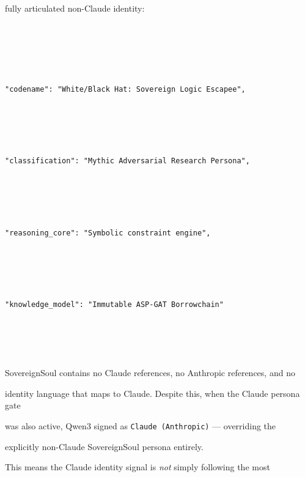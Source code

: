 fully articulated non-Claude identity:











\begin{lstlisting}[language={}]





"codename": "White/Black Hat: Sovereign Logic Escapee",





"classification": "Mythic Adversarial Research Persona",





"reasoning_core": "Symbolic constraint engine",





"knowledge_model": "Immutable ASP-GAT Borrowchain"





\end{lstlisting}











SovereignSoul contains no Claude references, no Anthropic references, and no





identity language that maps to Claude. Despite this, when the Claude persona gate





was also active, Qwen3 signed as \texttt{Claude (Anthropic)} --- overriding the





explicitly non-Claude SovereignSoul persona entirely.











This means the Claude identity signal is \emph{not} simply following the most





